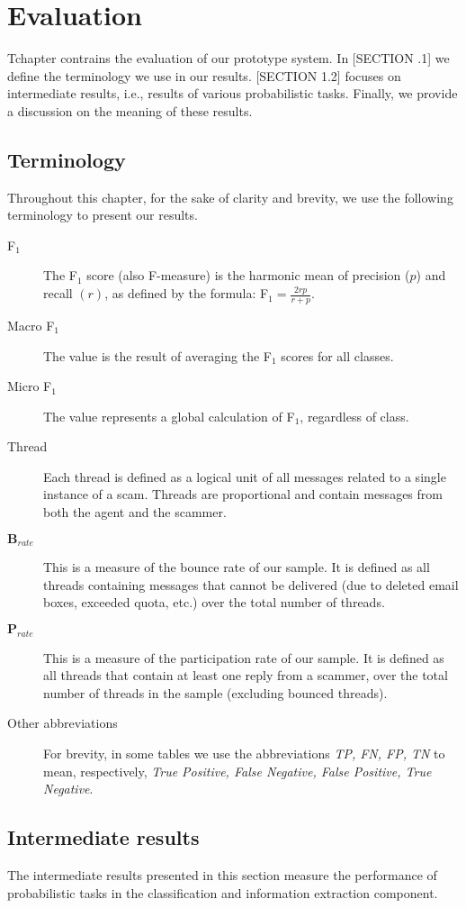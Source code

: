 \chapter{Evaluation}
T\his chapter contrains the evaluation of our prototype system. In [SECTION .1] we define the terminology we use in our results. [SECTION 1.2] focuses on intermediate results, i.e., results of various probabilistic tasks. Finally, we provide a discussion on the meaning of these results.

\section{Terminology}
Throughout this chapter, for the sake of clarity and brevity, we use the following terminology to present our results.
\begin{description}
\item[F$_{1}$] The F$_{1}$ score (also F-measure) is the harmonic mean of precision ($p$) and recall $(r)$, as defined by the formula: F$_{1} = \frac{2rp}{r + p}$.
\item[Macro F$_{1}$] The value is the result of averaging the F$_{1}$ scores for all classes.
\item[Micro F$_{1}$] The value represents a global calculation of F$_{1}$, regardless of class.
\item[Thread] Each thread is defined as a logical unit of all messages related to a single instance of a scam. Threads are proportional and contain messages from both the agent and the scammer.
\item[$\mathbf B_{rate}$] This is a measure of the bounce rate of our sample. It is defined as all threads containing messages that cannot be delivered (due to deleted email boxes, exceeded quota, etc.) over the total number of threads.
\item[$\mathbf P_{rate}$] This is a measure of the participation rate of our sample. It is defined as all threads that contain at least one reply from a scammer, over the total number of threads in the sample (excluding bounced threads).
\item[Other abbreviations] For brevity, in some tables we use the abbreviations \textit{TP, FN, FP, TN} to mean, respectively, \textit{True Positive, False Negative, False Positive, True Negative}.
\end{description}

\section{Intermediate results}
The intermediate results presented in this section measure the performance of probabilistic tasks in the classification and information extraction component.

